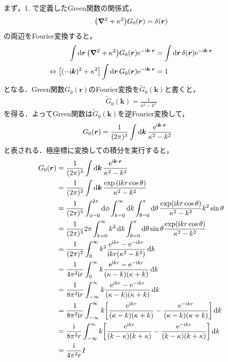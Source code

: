 \documentclass{report}
\begin{document}
    \par
    まず，1. で定義したGreen関数の関係式，
    \begin{align}
      \qty(\grad^2 + \kappa^2)G_0(\bm{r}) = \delta(\bm{r})
    \end{align}
    の両辺をFourier変換すると，
    \begin{align}
      \int\dd{\bm{r}} \qty(\grad^2 + \kappa^2) G_0(\bm{r}) \mathrm{e}^{-\mathrm{i}\bm{k} \cdot \bm{r}} &= \int\dd{\bm{r}} \delta(\bm{r})\mathrm{e}^{-\mathrm{i}\bm{k}\cdot\bm{r}} \\
      \Leftrightarrow \qty[(-\mathrm{i}\bm{k})^2 + \kappa^2] \int\dd{\bm{r}} G_0(\bm{r}) \mathrm{e}^{-\mathrm{i} \bm{k}\cdot \bm{r}} &= 1
    \end{align}
    となる．Green関数$G_0(\bm{r})$のFourier変換を$\tilde{G}_0(\bm{k})$と書くと，
    \begin{align}
      \tilde{G}_0(\bm{k}) = \frac{1}{\kappa^2 - k^2}
    \end{align}
    を得る．よってGreen関数は$\tilde{G}_0(\bm{k})$を逆Fourier変換して，
    \begin{align}
      G_0(\bm{r}) &= \frac{1}{(2\pi)^3}\int\dd{\bm{k}} \frac{\mathrm{e}^{\mathrm{i}\bm{k} \cdot \bm{r}}}{\kappa^2 - k^2}\label{g-tilde-to-gr}
    \end{align}
    と表される．極座標に変換しての積分を実行すると，
    \begin{align}
      G_0(\bm{r}) &=  \frac{1}{(2\pi)^3}\int\dd{\bm{k}}\frac{\mathrm{e}^{\mathrm{i}\bm{k} \cdot \bm{r}}}{\kappa^2 - k^2}\\ 
      &= \frac{1}{(2\pi)^3} \int\dd{\bm{k}} \frac{\exp\qty(\mathrm{i} kr\cos\theta)}{\kappa^2 - k^2} \\ 
      &= \frac{1}{(2\pi)^3} \int_{\phi = 0}^{2\pi}\dd{\phi}\int_{k = 0}^{\infty}\dd{k}\int_{\theta = 0}^{\pi}\dd{\theta} \frac{\exp(\mathrm{i} kr \cos \theta)}{\kappa^2 - k^2} k^2\sin\theta \\
      &= \frac{1}{(2\pi)^3} 2\pi \int_{k = 0}^{\infty} k^2 \dd{k} \int_{\theta = 0}^{\pi}\dd{\theta} \sin\theta\frac{\exp(\mathrm{i} k r\cos\theta)}{\kappa^2 - k^2} \\
      &= \frac{1}{(2\pi)^2} \int_{0}^{\infty}k^2\frac{\mathrm{e}^{\mathrm{i} kr} - \mathrm{e}^{-\mathrm{i} kr}}{\mathrm{i} kr\qty(\kappa^2 - k^2)}\dd{k} \\
      &= \frac{1}{4\pi^2\mathrm{i} r} \int_{0}^{\infty}k \frac{\mathrm{e}^{\mathrm{i} kr} - \mathrm{e}^{-\mathrm{i} kr}}{(\kappa - k)(\kappa + k)}\dd{k} \\
      &= \frac{1}{8\pi^2\mathrm{i} r} \int_{-\infty}^{\infty}k \frac{\mathrm{e}^{\mathrm{i} kr} - \mathrm{e}^{-\mathrm{i} kr}}{(\kappa - k)(\kappa + k)}\dd{k} \\
      &= \frac{1}{8\pi^2\mathrm{i} r} \int_{-\infty}^{\infty}k \qty[\frac{\mathrm{e}^{\mathrm{i} kr}}{(\kappa - k)(\kappa + k)} - \frac{\mathrm{e}^{-\mathrm{i} kr}}{(\kappa - k)(\kappa + k)}]\dd{k} \\ 
      &= \frac{\mathrm{i}}{8\pi^2 r} \int_{-\infty}^{\infty}k \qty[\frac{\mathrm{e}^{\mathrm{i} kr}}{(k - \kappa)(k + \kappa)} - \frac{\mathrm{e}^{-\mathrm{i} kr}}{(k - \kappa)(k + \kappa)}]\dd{k} \\ 
      &= \frac{\mathrm{i}}{4\pi^2 r}I
    \end{align}
\end{document}
